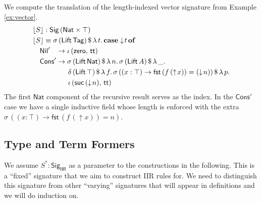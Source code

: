 \documentclass[acmsmall,screen,review,anonymous]{acmart}
\newcommand{\msf}[1]{{\mathsf{#1}}}
\newcommand{\mbf}[1]{{\mathbf{#1}}}
\newcommand{\Nat}{\msf{Nat}}
\newcommand{\zero}{\msf{zero}}
\newcommand{\suc}{\msf{suc}}
\newcommand{\Nil}{\msf{Nil}}
\newcommand{\Cons}{\msf{Cons}}
\newcommand{\Lift}{\msf{Lift}}
\newcommand{\lup}{\uparrow}
\newcommand{\ldown}{\downarrow}
\newcommand{\Sig}{\msf{Sig}}
\newcommand{\Tag}{\msf{Tag}}
\newcommand{\case}{\mbf{case}}
\newcommand{\of}{\mbf{of}}
\newcommand{\ttt}{\msf{tt}}
\newcommand{\fst}{\msf{fst}}
\newcommand{\IIR}{\msf{IIR}}
\newcommand{\floord}[1]{\lfloor #1 \rfloor}
\begin{document}
\begin{example} We compute the translation of the length-indexed vector signature from Example \ref{ex:vector}.
\begin{alignat*}{4}
  & \floord{S} : \Sig\,(\Nat \times \top)\\
  & \floord{S} \equiv \sigma\,(\Lift\,\Tag)\,\$\,\lambda\,t.\,\case \ldown\!t\,\of \\
  & \quad \Nil'\hspace{0.85em} \to \iota\,(\zero,\,\ttt) \\
  & \quad \Cons'\to \sigma\,(\Lift\,\Nat)\,\$\,\lambda\,n.\,\sigma\,(\Lift\,A)\,\$\,\lambda\,\_.\\
  & \quad \hspace{4em}  \delta\,(\Lift\,\top)\,\$\,\lambda\,f.\,\sigma\,((x : \top) \to \fst\,(f\,(\lup\!x)) = (\ldown\!n))\,\$\,\lambda\,p.\\
  & \quad \hspace{4em}  \iota\,(\suc\,(\ldown\!n),\,\ttt)
\end{alignat*}
The first $\Nat$ component of the recursive result serves as the index. In the $\Cons'$ case we
have a single inductive field whose length is enforced with the extra $\sigma\,((x : \top) \to
\fst\,(f\,(\lup\!x)) = n)$.

\end{example}

\subsection{Type and Term Formers}\label{sec:iir-construction-type-term}
We assume $S^* : \Sig_\IIR$ as a parameter to the constructions in the following. This is a
``fixed'' signature that we aim to construct IIR rules for. We need to distinguish this signature from
other ``varying'' signatures that will appear in definitions and we will do induction on.
\end{document}
